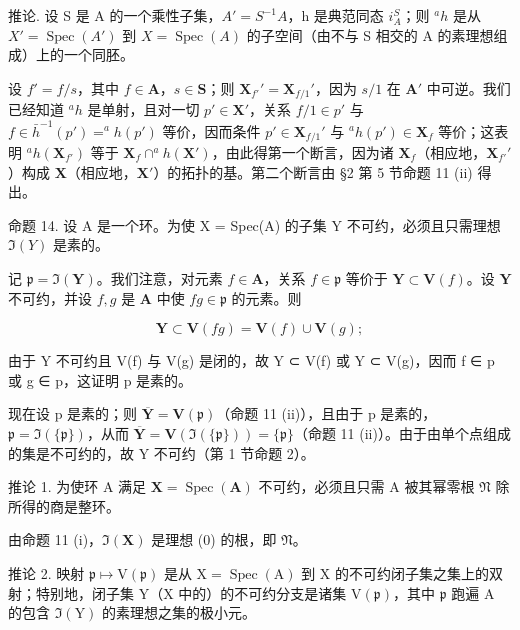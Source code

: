 推论. 设 S 是 A 的一个乘性子集，\(A' = S^{-1}A\)，h 是典范同态 \(i_{A}^{S}\)；则 \(^{a}h\) 是从 \(X' = \operatorname{Spec}(A')\) 到 \(X = \operatorname{Spec}(A)\) 的子空间（由不与 S 相交的 A 的素理想组成）上的一个同胚。

设 \(f' = f / s\)，其中 \(f \in \mathbf{A}\)，\(s \in \mathbf{S}\)；则 \(\mathbf{X}_{f'}' = \mathbf{X}_{f/1}'\)，因为 \(s / 1\) 在 \(\mathbf{A}'\) 中可逆。我们已经知道 \(^a h\) 是单射，且对一切 \(p' \in \mathbf{X}'\)，关系 \(f / 1 \in p'\) 与 \(f \in \bar{h}^{-1}(p') = ^a h(p')\) 等价，因而条件 \(p' \in \mathbf{X}_{f/1}'\) 与 \(^a h(p') \in \mathbf{X}_f\) 等价；这表明 \(^a h(\mathbf{X}_{f'})\) 等于 \(\mathbf{X}_f \cap ^a h(\mathbf{X}')\)，由此得第一个断言，因为诸 \(\mathbf{X}_f\)（相应地，\(\mathbf{X}_{f'}'\)）构成 \(\mathbf{X}\)（相应地，\(\mathbf{X}'\)）的拓扑的基。第二个断言由 §2 第 5 节命题 11 (ii) 得出。

命题 14. 设 A 是一个环。为使 X = Spec(A) 的子集 Y 不可约，必须且只需理想 \(\Im(Y)\) 是素的。

记 \(\mathfrak{p} = \Im(\mathbf{Y})\)。我们注意，对元素 \(f \in \mathbf{A}\)，关系 \(f \in \mathfrak{p}\) 等价于 \(\mathbf{Y} \subset \mathbf{V}(f)\)。设 \(\mathbf{Y}\) 不可约，并设 \(f, g\) 是 \(\mathbf{A}\) 中使 \(fg \in \mathfrak{p}\) 的元素。则

\[
\mathbf {Y} \subset \mathbf {V} (f g) = \mathbf {V} (f) \cup \mathbf {V} (g);
\]

由于 Y 不可约且 V(f) 与 V(g) 是闭的，故 Y ⊂ V(f) 或 Y ⊂ V(g)，因而 f ∈ p 或 g ∈ p，这证明 p 是素的。

现在设 p 是素的；则 \(\overline{\mathbf{Y}} = \mathbf{V}(\mathfrak{p})\)（命题 11 (ii)），且由于 p 是素的，\(\mathfrak{p} = \Im(\{\mathfrak{p}\})\)，从而 \(\overline{\mathbf{Y}} = \mathbf{V}(\Im(\{\mathfrak{p}\})) = \{\mathfrak{p}\}\)（命题 11 (ii)）。由于由单个点组成的集是不可约的，故 Y 不可约（第 1 节命题 2）。

推论 1. 为使环 A 满足 \(\mathbf{X} = \operatorname{Spec}(\mathbf{A})\) 不可约，必须且只需 A 被其幂零根 \(\mathfrak{N}\) 除所得的商是整环。

由命题 11 (i)，\(\Im(\mathbf{X})\) 是理想 (0) 的根，即 \(\mathfrak{N}\)。

推论 2. 映射 \(\mathfrak{p} \mapsto \mathrm{V}(\mathfrak{p})\) 是从 \(\mathrm{X} = \operatorname{Spec}(\mathrm{A})\) 到 \(\mathrm{X}\) 的不可约闭子集之集上的双射；特别地，闭子集 \(\mathrm{Y}\)（\(\mathrm{X}\) 中的）的不可约分支是诸集 \(\mathrm{V}(\mathfrak{p})\)，其中 \(\mathfrak{p}\) 跑遍 \(\mathrm{A}\) 的包含 \(\Im(\mathrm{Y})\) 的素理想之集的极小元。

